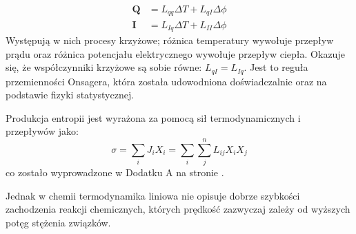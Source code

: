 \documentclass[10pt, a4paper, twoside, onecolumn]{article}
\numberwithin{equation}{section}
\begin{document}
	\begin{equation}
	\begin{split}
		\boldsymbol{Q} &= L_{qq}\Delta T+L_{qI}\Delta \phi \\
		\boldsymbol{I} &= L_{Iq}\Delta T+L_{II}\Delta \phi
	\end{split}
	\end{equation}
	Występują w nich procesy krzyżowe; różnica temperatury wywołuje przepływ prądu oraz różnica potencjału elektrycznego wywołuje przepływ ciepła.
	Okazuje się, że współczynniki krzyżowe są sobie równe: \(L_{qI}=L_{Iq}\). Jest to reguła przemienności Onsagera, która została udowodniona doświadczalnie oraz na podstawie fizyki statystycznej. \par
	Produkcja entropii jest wyrażona za pomocą sił termodynamicznych i przepływów jako: 
	\begin{equation}
		\sigma = \sum_{i}J_{i}X_{i} = \sum_{i}\sum_{j}^{n}L_{ij}X_{i}X_{j}
	\end{equation}
	co zostało wyprowadzone w Dodatku A na stronie \pageref{sec: dodatek A}. \par
	
	Jednak w chemii termodynamika liniowa nie opisuje dobrze szybkości zachodzenia reakcji chemicznych, których prędkość zazwyczaj zależy od wyższych potęg stężenia związków. \par
	
\end{document}
